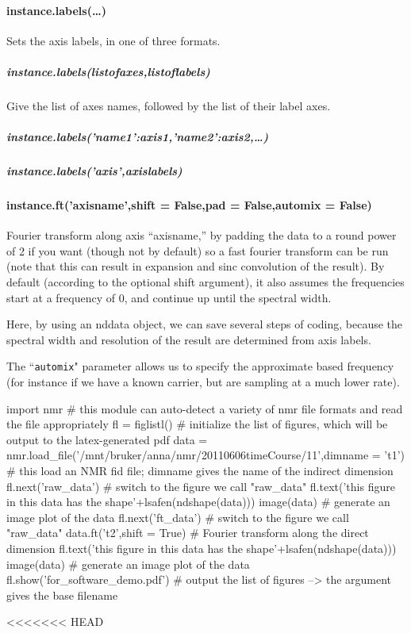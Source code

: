 \paragraph{instance.labels(\ldots)}
Sets the axis labels, in one of three formats.
\subparagraph{instance.labels(listofaxes,listoflabels)}
Give the list of axes names, followed by the list of their label axes.
\subparagraph{instance.labels({'name1':axis1,'name2':axis2,\ldots})}
\subparagraph{instance.labels('axis',axislabels)}
\paragraph{instance.ft('axisname',shift = False,pad = False,automix = False)}
Fourier transform along axis ``axisname,'' by padding the data to a round power of 2 if you want (though not by default) so a fast fourier transform can be run (note that this can result in expansion and sinc convolution of the result).
By default (according to the optional shift argument),
    it also assumes the frequencies start at a frequency of 0,
    and continue up until the spectral width.

Here, by using an nddata object, we can save several steps of coding,
    because the spectral width and resolution of the result are determined from
    axis labels.

The ``\texttt{automix}" parameter allows us to specify the approximate based frequency (for instance if we have a known carrier, but are sampling at a much lower rate).
    
\begin{python}
import nmr # this module can auto-detect a variety of nmr file formats and read the file appropriately
fl = figlistl() # initialize the list of figures, which will be output to the latex-generated pdf
data = nmr.load_file('/mnt/bruker/anna/nmr/20110606timeCourse/11',dimname = 't1') # this load an NMR fid file; dimname gives the name of the indirect dimension
fl.next('raw_data') # switch to the figure we call "raw_data"
fl.text('this figure in this data has the shape'+lsafen(ndshape(data)))
image(data) # generate an image plot of the data
fl.next('ft_data') # switch to the figure we call "raw_data"
data.ft('t2',shift = True) # Fourier transform along the direct dimension
fl.text('this figure in this data has the shape'+lsafen(ndshape(data)))
image(data) # generate an image plot of the data
fl.show('for_software_demo.pdf') # output the list of figures --> the argument gives the base filename
\end{python}
<<<<<<< HEAD
